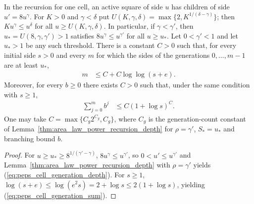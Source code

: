 \begin{lemma}
    \label{thm:peps_cell_generation_count}
    \leanok
    In the recursion for one cell, an active square of side $u$ has children
    of side $u'=8u^{\gamma}$. For $K>0$ and $\gamma<\delta$ put
    $U(K,\gamma,\delta)=\max\{2,K^{1/(\delta-\gamma)}\}$; then
    $Ku^{\gamma}\le u^{\delta}$ for all $u\ge U(K,\gamma,\delta)$.
    In particular, if $\gamma<\gamma'$, then $u_*=U(8,\gamma,\gamma')>1$
    satisfies $8u^{\gamma}\le u^{\gamma'}$ for all $u\ge u_*$. Let $0<\gamma'<1$ and let
    $u_*>1$ be any such threshold. There is a constant $C>0$ such that, for
    every initial side $s>0$ and every $m$ for which the sides of the
    generations $0,\dots,m-1$ are at least $u_*$,
    \begin{align}
        m & \le C+C\log\log(s+e).
        \label{eq:peps_cell_generation_depth}
    \end{align}
    Moreover, for every $b\ge0$ there exists $C>0$ such that, under the same condition with $s\ge1$,
    \begin{align}
        \sum_{j=0}^{m}b^{j} & \le C(1+\log s)^{C}.
        \label{eq:peps_cell_generation_sum}
    \end{align}
    One may take $C=\max\{C_g2^{C_g},C_g\}$, where $C_g$ is the
    generation-count constant of
    Lemma~\ref{thm:area_law_power_recursion_depth} for $\rho=\gamma'$,
    $S_*=u_*$ and branching bound $b$.
\end{lemma}
\begin{proof}\leanok
    For $u\ge u_*\ge8^{1/(\gamma'-\gamma)}$, $8u^{\gamma}\le u^{\gamma'}$, so
    $0<u'\le u^{\gamma'}$ and Lemma~\ref{thm:area_law_power_recursion_depth} with $\rho=\gamma'$
    yields (\ref{eq:peps_cell_generation_depth}). For $s\ge1$,
    $\log(s+e)\le\log(e^{2}s)=2+\log s\le2(1+\log s)$, yielding (\ref{eq:peps_cell_generation_sum}).
\end{proof}


